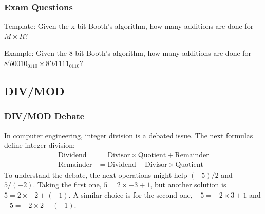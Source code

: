 \begin{frame}
    \frametitle{Exam Questions}
    Template: Given the x-bit Booth's algorithm, how many additions are done for $M \times R$?

    Example: Given the 8-bit Booth's algorithm, how many additions are done for $8'b0010_0110 \times 8'b1111_0110$?
\end{frame}

\subsection{DIV/MOD}

\begin{frame}
    \frametitle{DIV/MOD Debate}In computer engineering, integer division is a debated issue. The next formulas define integer division:
    \begin{equation}
        \begin{aligned}
        \text{Dividend} &= \text{Divisor} \times \text{Quotient} + \text{Remainder}\\
        \text{Remainder} &= \text{Dividend} - \text{Divisor} \times \text{Quotient} 
        \end{aligned}
    \end{equation}
    To understand the debate, the next operations might help $(-5)/2$ and $5/(-2)$.
    Taking the first one, $5=2 \times -3 + 1$, but another solution is $5=2 \times -2 + (-1)$.
    A similar choice is for the second one, $-5=-2 \times 3 + 1$ and $-5=-2 \times 2 + (-1)$.
\end{frame}

